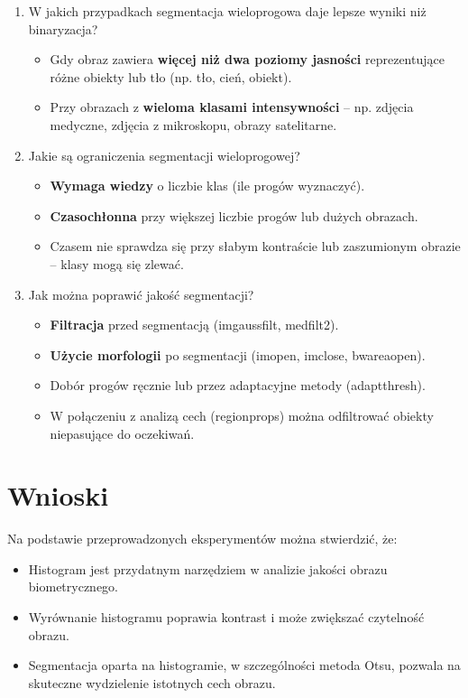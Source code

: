 \begin{enumerate}
	\item W jakich przypadkach segmentacja wieloprogowa daje lepsze wyniki niż binaryzacja?
	\begin{itemize}
		\item Gdy obraz zawiera \textbf{więcej niż dwa poziomy jasności} reprezentujące różne obiekty lub tło (np. tło, cień, obiekt).
		\item Przy obrazach z \textbf{wieloma klasami intensywności} – np. zdjęcia medyczne, zdjęcia z mikroskopu, obrazy satelitarne.
	\end{itemize}
	
	\item Jakie są ograniczenia segmentacji wieloprogowej?
	\begin{itemize}
		\item \textbf{Wymaga wiedzy} o liczbie klas (ile progów wyznaczyć).
		\item \textbf{Czasochłonna} przy większej liczbie progów lub dużych obrazach.
		\item Czasem nie sprawdza się przy słabym kontraście lub zaszumionym obrazie – klasy mogą się zlewać.
	\end{itemize}
	
	\item Jak można poprawić jakość segmentacji?
	\begin{itemize}
		\item \textbf{Filtracja} przed segmentacją (imgaussfilt, medfilt2).
		\item \textbf{Użycie morfologii} po segmentacji (imopen, imclose, bwareaopen).
		\item Dobór progów ręcznie lub przez adaptacyjne metody (adaptthresh).
		\item W połączeniu z analizą cech (regionprops) można odfiltrować obiekty niepasujące do oczekiwań.
	\end{itemize}
\end{enumerate}

\section{Wnioski}
Na podstawie przeprowadzonych eksperymentów można stwierdzić, że:
\begin{itemize}
    \item Histogram jest przydatnym narzędziem w analizie jakości obrazu biometrycznego.
    \item Wyrównanie histogramu poprawia kontrast i może zwiększać czytelność obrazu.
    \item Segmentacja oparta na histogramie, w szczególności metoda Otsu, pozwala na skuteczne wydzielenie istotnych cech obrazu.
\end{itemize}

